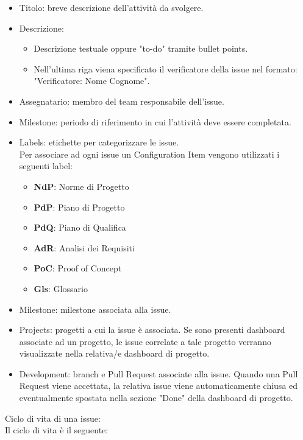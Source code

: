 \begin{itemize}
    \item Titolo: breve descrizione dell’attività da svolgere.
    \item Descrizione:
        \begin{itemize}
            \item Descrizione testuale oppure "to-do" tramite bullet points.
            \item Nell'ultima riga viena specificato il verificatore della issue nel formato: "Verificatore: Nome Cognome".
        \end{itemize}
    \item Assegnatario: membro del team responsabile dell'issue.
    \item Milestone: periodo di riferimento in cui l’attività deve essere completata.
    \item Labels: etichette per categorizzare le issue. \\Per associare ad ogni issue un Configuration Item vengono utilizzati i seguenti label:
        \begin{itemize}
            \item \textbf{NdP}: Norme di Progetto
            \item \textbf{PdP}: Piano di Progetto
            \item \textbf{PdQ}: Piano di Qualifica
            \item \textbf{AdR}: Analisi dei Requisiti
            \item \textbf{PoC}: Proof of Concept
            \item \textbf{Gls}: Glossario
        \end{itemize}
    \item Milestone: milestone associata alla issue.
    \item Projects: progetti a cui la issue è associata. Se sono presenti dashboard associate ad un progetto, le issue correlate a tale progetto verranno visualizzate nella relativa/e dashboard di progetto.
    \item Development: branch e Pull Request associate alla issue. Quando una Pull Request viene accettata, la relativa issue viene automaticamente chiusa ed eventualmente spostata nella sezione "Done" della dashboard di progetto.
\end{itemize}
Ciclo di vita di una issue:\\
Il ciclo di vita è il seguente:
